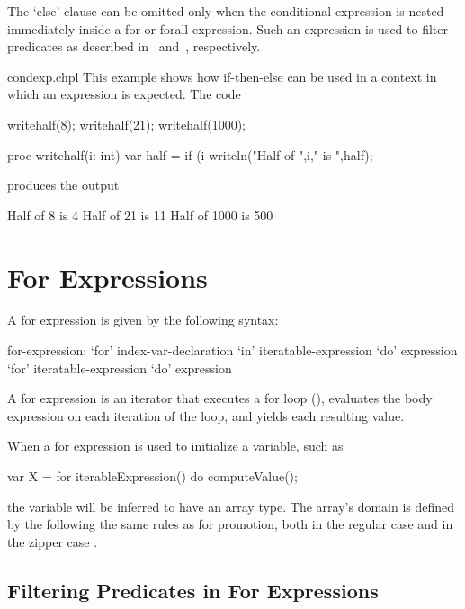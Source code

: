 The `else' clause can be omitted only when the conditional expression
is nested immediately inside a for or forall expression.  Such an expression
is used to filter predicates as described
in~ and~,
respectively.

\begin{chapelexample}{condexp.chpl}
This example shows how if-then-else can be used in a context in which an
expression is expected.  The code
\begin{chapel}
writehalf(8);
writehalf(21);
writehalf(1000);

proc writehalf(i: int) {
  var half = if (i %
  writeln("Half of ",i," is ",half); 
}
\end{chapel}
produces the output
\begin{chapelprintoutput}{}
Half of 8 is 4
Half of 21 is 11
Half of 1000 is 500
\end{chapelprintoutput}
\end{chapelexample}

\section{For Expressions}
\label{For_Expressions}

A for expression is given by the following syntax:
\begin{syntax}
for-expression:
  `for' index-var-declaration `in' iteratable-expression `do' expression
  `for' iteratable-expression `do' expression
\end{syntax}
A for expression is an iterator that executes a for loop (),
evaluates the body expression on each iteration of the loop,
and yields each resulting value.

When a for expression is used to initialize a variable, such as
\begin{chapel}
var X = for iterableExpression() do computeValue();
\end{chapel}
the variable will be inferred to have an array type.
The array's domain is defined by the 
following the same rules as for promotion, both in the regular
case  and in the zipper case .

\subsection{Filtering Predicates in For Expressions}
\label{Filtering_Predicates_For}

